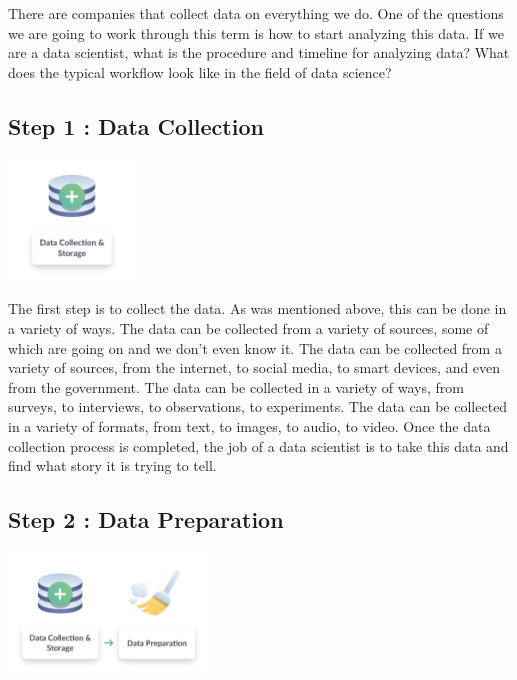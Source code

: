 \documentclass[
  letterpaper,
  DIV=11,
  numbers=noendperiod]{scrreprt}
\begin{document}
There are companies that collect data on everything we do. One of the
questions we are going to work through this term is how to start
analyzing this data. If we are a data scientist, what is the procedure
and timeline for analyzing data? What does the typical workflow look
like in the field of data science?

\subsection*{Step 1 : Data Collection}\label{step-1-data-collection}

\includegraphics[width=0.25\textwidth,height=\textheight]{./images/WIDS-3.jpg}

The first step is to collect the data. As was mentioned above, this can
be done in a variety of ways. The data can be collected from a variety
of sources, some of which are going on and we don't even know it. The
data can be collected from a variety of sources, from the internet, to
social media, to smart devices, and even from the government. The data
can be collected in a variety of ways, from surveys, to interviews, to
observations, to experiments. The data can be collected in a variety of
formats, from text, to images, to audio, to video. Once the data
collection process is completed, the job of a data scientist is to take
this data and find what story it is trying to tell.

\subsection*{Step 2 : Data Preparation}\label{step-2-data-preparation}

\includegraphics[width=0.4\textwidth,height=\textheight]{./images/WIDS-4.jpg}
\end{document}
